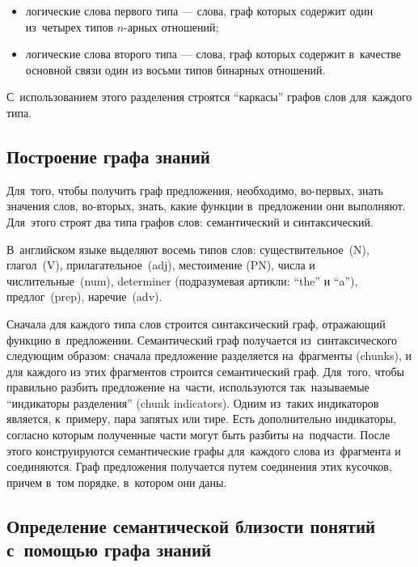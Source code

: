 \begin{itemize}

\item{
логические слова первого типа --- слова, граф которых содержит один из~четырех типов $n$-арных отношений;
}

\item{
логические слова второго типа --- слова, граф которых содержит в~качестве основной связи один из восьми типов 
бинарных отношений.
}

\end {itemize}

С~использованием этого разделения строятся ``каркасы'' графов слов для~каждого типа. 

\subsection {Построение графа знаний}

Для~того, чтобы получить граф предложения, необходимо, 
во-первых,  знать значения слов,
во-вторых, знать, какие функции в~предложении они выполняют. 
Для~этого строят два типа графов слов: семантический и синтаксический.

В~английском языке выделяют восемь типов слов: 
существительное~(N), 
глагол~(V), 
прилагательное~(adj),
местоимение (PN), 
числа и числительные~(num), 
determiner (подразумевая артикли: ``the'' и ``a''), 
предлог~(prep),
наречие~(adv).

Сначала для каждого типа слов строится синтаксический граф, отражающий функцию в~предложении.
Семантический граф получается из~синтаксического следующим образом: 
сначала предложение разделяется на~фрагменты (chunks), и для каждого из этих фрагментов строится семантический граф. 
Для~того, чтобы правильно разбить предложение на~части,  используются так~называемые ``индикаторы разделения'' (chunk indicators). 
Одним из~таких индикаторов является, к~примеру, пара запятых или тире. 
Есть дополнительно индикаторы, согласно которым полученные части могут быть разбиты на~подчасти.
После этого конструируются семантические графы для~каждого слова из~фрагмента и соединяются.
Граф предложения получается путем соединения этих кусочков, причем в~том порядке, 
в~котором они даны.

\subsection{Определение семантической близости понятий с~помощью графа знаний}

